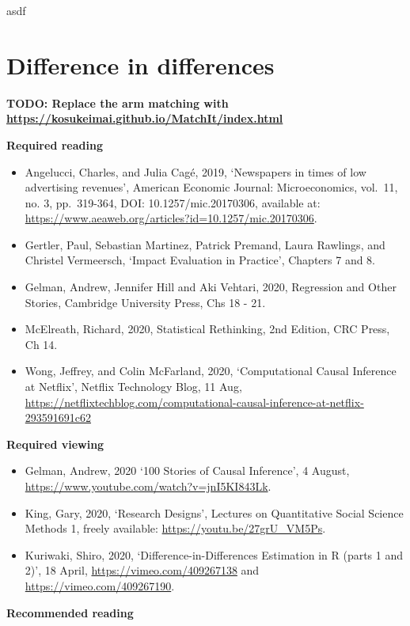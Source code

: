 \documentclass[
]{book}
\providecommand{\tightlist}{%
  \setlength{\itemsep}{0pt}\setlength{\parskip}{0pt}}
\begin{document}
asdf

\hypertarget{difference-in-differences}{%
\chapter{Difference in differences}\label{difference-in-differences}}

\textbf{TODO: Replace the arm matching with \url{https://kosukeimai.github.io/MatchIt/index.html}}

\textbf{Required reading}

\begin{itemize}
\tightlist
\item
  Angelucci, Charles, and Julia Cagé, 2019, `Newspapers in times of low advertising revenues', American Economic Journal: Microeconomics, vol.~11, no. 3, pp.~319-364, DOI: 10.1257/mic.20170306, available at: \url{https://www.aeaweb.org/articles?id=10.1257/mic.20170306}.
\item
  Gertler, Paul, Sebastian Martinez, Patrick Premand, Laura Rawlings, and Christel Vermeersch, `Impact Evaluation in Practice', Chapters 7 and 8.
\item
  Gelman, Andrew, Jennifer Hill and Aki Vehtari, 2020, Regression and Other Stories, Cambridge University Press, Chs 18 - 21.
\item
  McElreath, Richard, 2020, Statistical Rethinking, 2nd Edition, CRC Press, Ch 14.
\item
  Wong, Jeffrey, and Colin McFarland, 2020, `Computational Causal Inference at Netflix', Netflix Technology Blog, 11 Aug, \url{https://netflixtechblog.com/computational-causal-inference-at-netflix-293591691c62}
\end{itemize}

\textbf{Required viewing}

\begin{itemize}
\tightlist
\item
  Gelman, Andrew, 2020 `100 Stories of Causal Inference', 4 August, \url{https://www.youtube.com/watch?v=jnI5KI843Lk}.
\item
  King, Gary, 2020, `Research Designs', Lectures on Quantitative Social Science Methods 1, freely available: \url{https://youtu.be/27grU_VM5Ps}.
\item
  Kuriwaki, Shiro, 2020, `Difference-in-Differences Estimation in R (parts 1 and 2)', 18 April, \url{https://vimeo.com/409267138} and \url{https://vimeo.com/409267190}.
\end{itemize}

\textbf{Recommended reading}
\end{document}
